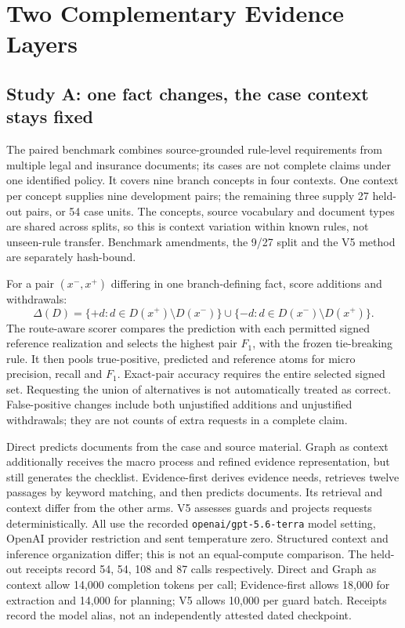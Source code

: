 \section{Two Complementary Evidence Layers}
\label{sec:studies}

\subsection{Study A: one fact changes, the case context stays fixed}

The paired benchmark combines source-grounded rule-level requirements from
multiple legal and insurance documents; its cases are not complete claims
under one identified policy. It covers nine branch concepts in four
contexts. One context per concept supplies nine development pairs; the
remaining three supply 27 held-out pairs, or 54 case units. The concepts,
source vocabulary and document types are shared across splits, so this is
context variation within known rules, not unseen-rule transfer. Benchmark
amendments, the 9/27 split and the V5 method are separately hash-bound.

For a pair $(x^-,x^+)$ differing in one branch-defining fact, score additions
and withdrawals:
\begin{equation}
\Delta(D)=\{+d:d\in D(x^+)\setminus D(x^-)\}
 \cup\{-d:d\in D(x^-)\setminus D(x^+)\}.
\label{eq:delta}
\end{equation}
The route-aware scorer compares the prediction with each permitted signed
reference realization and selects the highest pair $F_1$, with the frozen
tie-breaking rule. It then pools true-positive, predicted and reference
atoms for micro precision, recall and $F_1$. Exact-pair accuracy requires
the entire selected signed set. Requesting the union of alternatives is
not automatically treated as correct. False-positive changes include both
unjustified additions and unjustified withdrawals; they are not counts of
extra requests in a complete claim.

Direct predicts documents from the case and source material. Graph as
context additionally receives the macro process and refined evidence
representation, but still generates the checklist. Evidence-first derives
evidence needs, retrieves twelve passages by keyword matching, and then
predicts documents. Its retrieval and context differ from the other arms. V5 assesses
guards and projects requests deterministically. All use the recorded
\texttt{openai/gpt-5.6-terra} model setting, OpenAI provider restriction and
sent temperature zero. Structured context and inference organization differ;
this is not an equal-compute comparison. The held-out receipts record
54, 54, 108 and 87 calls respectively. Direct and Graph as context allow
14,000 completion tokens per call; Evidence-first allows 18,000 for
extraction and 14,000 for planning; V5 allows 10,000 per guard batch.
Receipts record the model alias, not an independently attested dated checkpoint.

